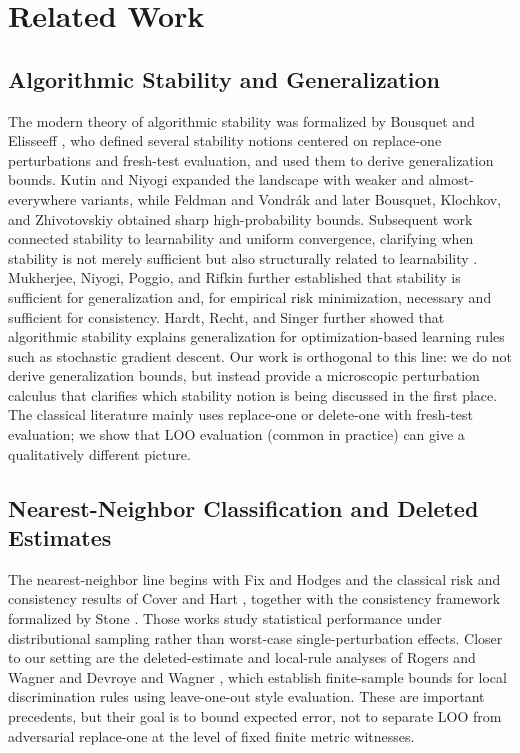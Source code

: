 \section{Related Work}
\label{sec:related-work}

\subsection{Algorithmic Stability and Generalization}

The modern theory of algorithmic stability was formalized by Bousquet and
Elisseeff \cite{bousquet2002stability}, who defined several stability notions
centered on replace-one perturbations and fresh-test evaluation, and used them
to derive generalization bounds. Kutin and Niyogi \cite{kutin2002almost}
expanded the landscape with weaker and almost-everywhere variants, while
Feldman and Vondr\'ak \cite{feldman2019high} and later Bousquet, Klochkov, and
Zhivotovskiy \cite{bousquet2020sharpening} obtained sharp high-probability
bounds.  Subsequent work connected stability to learnability and uniform
convergence, clarifying when stability is not merely sufficient but also
structurally related to learnability \cite{shalev2010learnability}. Mukherjee,
Niyogi, Poggio, and Rifkin \cite{mukherjee2006learning} further established that
stability is sufficient for generalization and, for empirical risk minimization,
necessary and sufficient for consistency. Hardt,
Recht, and Singer \cite{hardt2016train} further showed that algorithmic
stability explains generalization for optimization-based learning rules such as
stochastic gradient descent. Our work is orthogonal to this line: we do not
derive generalization bounds, but instead provide a microscopic perturbation
calculus that clarifies which stability notion is being discussed in the first
place.  The classical literature mainly uses replace-one or delete-one with
fresh-test evaluation; we show that LOO evaluation (common in practice) can
give a qualitatively different picture.

\subsection{Nearest-Neighbor Classification and Deleted Estimates}

The nearest-neighbor line begins with Fix and Hodges \cite{fix1951discriminatory}
and the classical risk and consistency results of Cover and Hart
\cite{cover1967nearest,cover1968estimation}, together with the consistency
framework formalized by Stone \cite{stone1977consistent}.  Those works study
statistical performance under distributional sampling rather than worst-case
single-perturbation effects.  Closer to our setting are the deleted-estimate
and local-rule analyses of Rogers and Wagner \cite{rogers1978finite} and
Devroye and Wagner \cite{devroye1979distribution,devroye1979local}, which
establish finite-sample bounds for local discrimination rules using
leave-one-out style evaluation.  These are important precedents, but their
goal is to bound expected error, not to separate LOO from adversarial
replace-one at the level of fixed finite metric witnesses.

